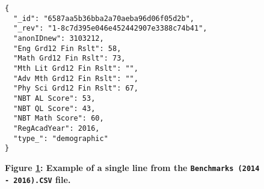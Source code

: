 \begin{figure}[H]
  \centering
  \begin{mdframed}
    \centering
    \begin{verbatim}
{
  "_id": "6587aa5b36bba2a70aeba96d06f05d2b",
  "_rev": "1-8c7d395e046e452442907e3388c74b41",
  "anonIDnew": 3103212,
  "Eng Grd12 Fin Rslt": 58,
  "Math Grd12 Fin Rslt": 73,
  "Mth Lit Grd12 Fin Rslt": "",
  "Adv Mth Grd12 Fin Rslt": "",
  "Phy Sci Grd12 Fin Rslt": 67,
  "NBT AL Score": 53,
  "NBT QL Score": 43,
  "NBT Math Score": 60,
  "RegAcadYear": 2016,
  "type_": "demographic"
}         
        \end{verbatim}
  \end{mdframed}
  \caption[Event Document JSON Sample]{\textbf{Figure \ref{fig-benchmarks-json-sample}: Example of a single line from the \texttt{Benchmarks (2014 - 2016).CSV} file.}}
  \label{fig-benchmarks-json-sample}
\end{figure}